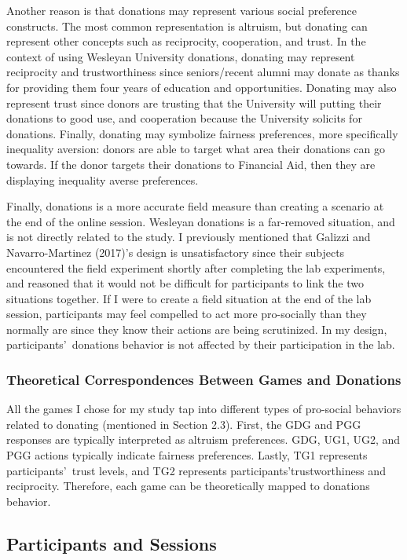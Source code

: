 \documentclass[12pt]{article}
\begin{document}
Another reason is that donations may represent various social preference constructs. The most common representation is altruism, but donating can represent other concepts such as reciprocity, cooperation, and trust. In the context of using Wesleyan University donations, donating may represent reciprocity and trustworthiness since seniors/recent alumni may donate as thanks for providing them four years of education and opportunities. Donating may also represent trust since donors are trusting that the University will putting their donations to good use, and cooperation because the University solicits for donations. Finally, donating may symbolize fairness preferences, more specifically inequality aversion: donors are able to target what area their donations can go towards. If the donor targets their donations to Financial Aid, then they are displaying inequality averse preferences.

Finally, donations is a more accurate field measure than creating a scenario at the end of the online session. Wesleyan donations is a far-removed situation, and is not directly related to the study. I previously mentioned that Galizzi and Navarro-Martinez (2017)\rq s design is unsatisfactory since their subjects encountered the field experiment shortly after completing the lab experiments, and reasoned that it would not be difficult for participants to link the two situations together. If I were to create a field situation at the end of the lab session, participants may feel compelled to act more pro-socially than they normally are since they know their actions are being scrutinized. In my design, participants\rq \ donations behavior is not affected by their participation in the lab.

\subsubsection{Theoretical Correspondences Between Games and Donations}

All the games I chose for my study tap into different types of pro-social behaviors related to donating (mentioned in Section 2.3). First, the GDG and PGG responses are typically interpreted as altruism preferences. GDG, UG1, UG2, and PGG actions typically indicate fairness preferences. Lastly, TG1 represents participants\rq \ trust levels, and TG2 represents participants\rq trustworthiness and reciprocity. Therefore, each game can be theoretically mapped to donations behavior.
	
\subsection{Participants and Sessions}
\end{document}
